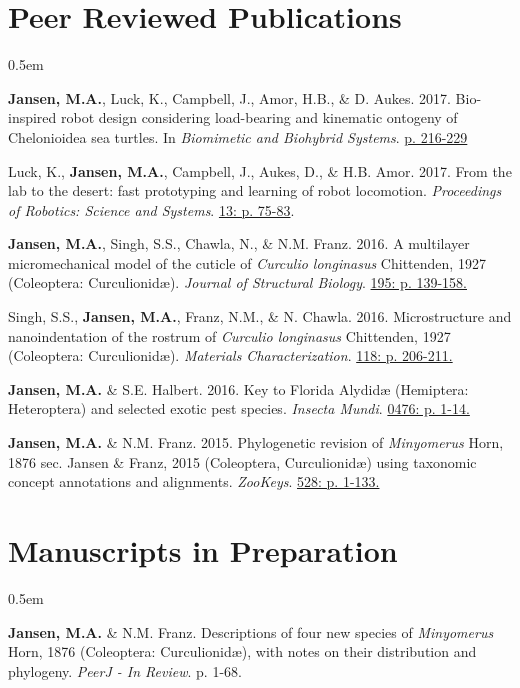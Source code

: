 \documentclass[12pt,a4paper]{article}
\begin{document}
\section*{Peer Reviewed Publications}
	\begin{description}
		\itemsep0.5em
		\item \textbf{Jansen, M.A.}, Luck, K., Campbell, J., Amor, H.B., \& D. Aukes. 2017. Bio-inspired robot design considering load-bearing and kinematic ontogeny of Chelonioidea sea turtles. In \textit{Biomimetic and Biohybrid Systems}. \href{http://www.springer.com/us/book/9783319635361}{p. 216-229}
		\item Luck, K., \textbf{Jansen, M.A.}, Campbell, J., Aukes, D., \& H.B. Amor. 2017. From the lab to the desert: fast prototyping and learning of robot locomotion. \textit{Proceedings of Robotics: Science and Systems}. \href{http://www.roboticsproceedings.org/rss13/p75.html}{13: p. 75-83}.
		\item \textbf{Jansen, M.A.}, Singh, S.S., Chawla, N., \& N.M. Franz. 2016. A multilayer micromechanical model of the cuticle of \textit{Curculio longinasus} Chittenden, 1927 (Coleoptera: Curculionid\ae). \textit{Journal of Structural Biology}. \href{http://www.sciencedirect.com/science/article/pii/S1047847716300922}{195: p. 139-158.}
		\item Singh, S.S., \textbf{Jansen, M.A.}, Franz, N.M., \& N. Chawla. 2016. Microstructure and nanoindentation of the rostrum of \textit{Curculio longinasus} Chittenden, 1927 (Coleoptera: Curculionid\ae). \textit{Materials Characterization}. \href{http://www.sciencedirect.com/science/article/pii/S1044580316301619}{118: p. 206-211.}
		\item \textbf{Jansen, M.A.} \& S.E. Halbert. 2016. Key to Florida Alydid{\ae} (Hemiptera: Heteroptera) and selected exotic pest species. \textit{Insecta Mundi}. \href{http://journals.fcla.edu/mundi/article/view/87952/84644}{0476: p. 1-14.}
		\item \textbf{Jansen, M.A.} \& N.M. Franz. 2015. Phylogenetic revision of \textit{Minyomerus} Horn, 1876 sec. Jansen \& Franz, 2015 (Coleoptera, Curculionid\ae) using taxonomic concept annotations and alignments. \textit{ZooKeys}. \href{http://zookeys.pensoft.net/articles.php?id=6001}{528: p. 1-133.}
	\end{description}

\section*{Manuscripts in Preparation}
	\begin{description}
		\itemsep0.5em
		\item \textbf{Jansen, M.A.} \& N.M. Franz. Descriptions of four new species of \textit{Minyomerus} Horn, 1876 (Coleoptera: Curculionid\ae), with notes on their distribution and phylogeny. \textit{PeerJ - In Review}. p. 1-68.
	\end{description}
\end{document}
